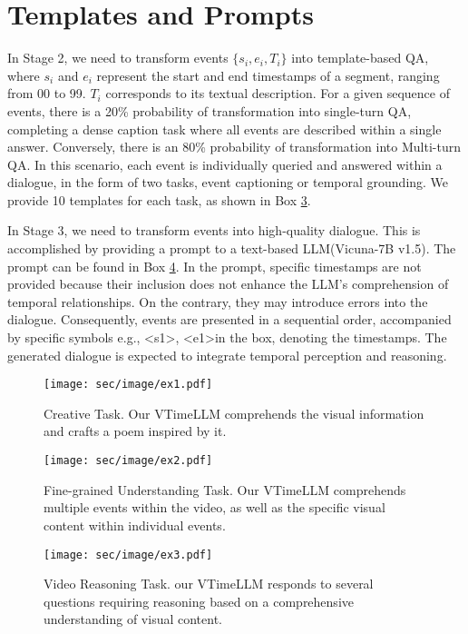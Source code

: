 \documentclass[10pt,twocolumn,letterpaper]{article}
\begin{document}
\section{Templates and Prompts}


In Stage 2, we need to transform events $\{s_i, e_i, T_i\}$ into template-based QA, where $s_i$ and $e_i$ represent the start and end timestamps of a segment, ranging from 00 to 99. $T_i$ corresponds to its textual description.  For a given sequence of events, there is a 20\% probability of transformation into single-turn QA, completing a dense caption task where all events are described within a single answer. Conversely, there is an 80\% probability of transformation into Multi-turn QA. In this scenario, each event is individually queried and answered within a dialogue, in the form of two tasks, event captioning or temporal grounding. We provide 10 templates for each task, as shown in Box \hyperlink{box3}{3}.


In Stage 3, we need to transform events into high-quality dialogue. This is accomplished by providing a prompt to a text-based LLM(Vicuna-7B v1.5). The prompt can be found in Box \hyperlink{box4}{4}. In the prompt, specific timestamps are not provided because their inclusion does not enhance the LLM's comprehension of temporal relationships. On the contrary, they may introduce errors into the dialogue. Consequently, events are presented in a sequential order, accompanied by specific symbols e.g., \textless s1\textgreater, \textless e1\textgreater in the box, denoting the timestamps. The generated dialogue is expected to integrate temporal perception and reasoning.


\begin{figure}[htbp]
  \centering
  \texttt{[image: sec/image/ex1.pdf]}
  \caption{Creative Task. Our VTimeLLM comprehends the visual information and crafts a poem inspired by it.}
  \label{fig:ex1}
\end{figure}


\begin{figure}[htbp]
  \centering
  \texttt{[image: sec/image/ex2.pdf]}
  \caption{Fine-grained Understanding Task. Our VTimeLLM comprehends multiple events within the video, as well as the specific visual content within individual events.}
  \label{fig:ex2}
\end{figure}


\begin{figure}[htbp]
  \centering
  \texttt{[image: sec/image/ex3.pdf]}
  \caption{Video Reasoning Task. our VTimeLLM responds to several questions requiring reasoning based on a comprehensive understanding of visual content.}
  \label{fig:ex3}
\end{figure}
\end{document}
